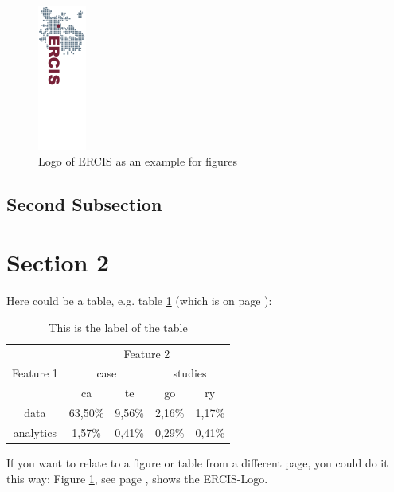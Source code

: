 \documentclass[a4paper, 12pt, titlepage, headsepline, listof = totoc, bibliography = totoc, numbers = noenddot]{scrartcl}
\begin{document}
	\begin{figure}[t!]
	\centering
	  \includegraphics[height=0.49\textwidth,angle=90]{images/ercis.png}
	    \caption{Logo of ERCIS as an example for figures}
	  \label{ERCIS_Logo}
	\end{figure}

  \subsection{Second Subsection}

\newpage
\section{Section 2}
Here could be a table, e.g. table \ref{tab} (which is on page \pageref{tab}):

\begin{table}[ht] 
   \centering
      \begin{tabular}{|c||c|c|c|c|} \hline
			& \multicolumn{4}{c|}{Feature 2} 						\\
	Feature 1 & \multicolumn{2}{c|}{case} & \multicolumn{2}{c|}{studies}	\\
			& ca 			& te 		& go 	& ry 					\\ \hline \hline
	data 		& 63,50\% 	& 9,56\% 	& 2,16\% 	& 1,17\% 				\\ \hline
	analytics 	& 1,57\% 		& 0,41\% 	& 0,29\% 	& 0,41\% 				\\ \hline
      \end{tabular}
      \caption{This is the label of the table}
   \label{tab}
\end{table}


If you want to relate to a figure or table from a different page, you could do it this way: Figure \ref{ERCIS_Logo}, see page \pageref{ERCIS_Logo}, shows the ERCIS-Logo.

\end{document}
